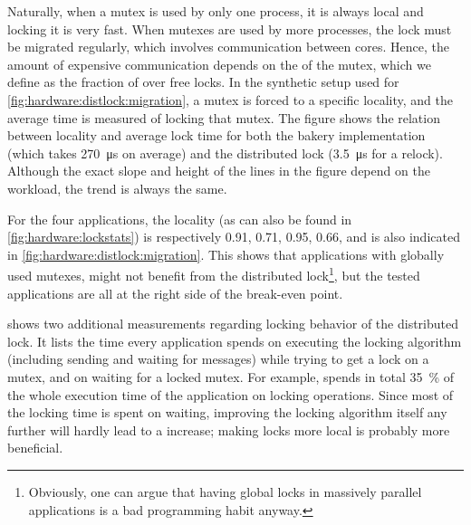 Naturally, when a mutex is used by only one process, it is always local and locking it is very fast.
When mutexes are used by more processes, the lock must be migrated regularly, which involves communication between cores.
Hence, the amount of expensive communication depends on the \emph{} of the mutex, which we define as the fraction of  over free locks.
In the synthetic setup used for \cref{fig:hardware:distlock:migration}, a mutex is forced to a specific locality, and the average time is measured of locking that mutex.
The figure shows the relation between locality and average lock time for both the bakery implementation (which takes \SI{270}{\micro\second} on average) and the distributed lock (\SI{3.5}{\micro\second} for a relock).
Although the exact slope and height of the lines in the figure depend on the workload, the trend is always the same.

For the four applications, the locality (as can also be found in \vref{fig:hardware:lockstats}) is respectively \num{0.91}, \num{0.71}, \num{0.95}, \num{0.66}, and is also indicated in \cref{fig:hardware:distlock:migration}.
This shows that applications with globally used mutexes, might not benefit from the distributed lock\footnote{%
	Obviously, one can argue that having global locks in massively parallel applications is a bad programming habit anyway.}, %
but the tested applications are all at the right side of the break-even point.

 shows two additional measurements regarding locking behavior of the distributed lock.
It lists the time every application spends on executing the locking algorithm (including sending and waiting for messages) while trying to get a lock on a mutex, and on waiting for a locked mutex.
For example,  spends in total \SI{35}{\percent} of the whole execution time of the application on locking operations.
Since most of the locking time is spent on waiting, improving the locking algorithm itself any further will hardly lead to a  increase; making locks more local is probably more beneficial.


